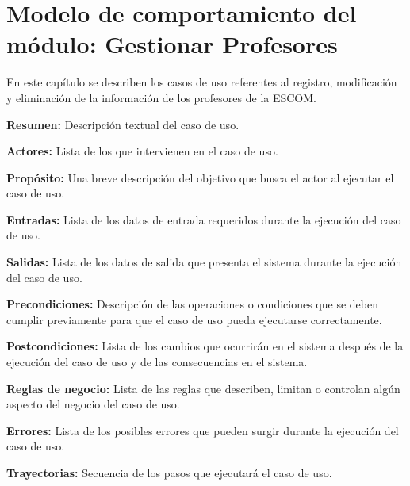 \newpage

\section{Modelo de comportamiento del módulo: Gestionar Profesores \label{chp:gestionarProfesores}}
En este capítulo se describen los casos de uso referentes al registro, modificación y eliminación de la información de los profesores de la ESCOM. \bigskip

     \begin{objetivos}
	\item {\bf Resumen:} Descripción textual del caso de uso.
	\item {\bf Actores:} Lista de los 
	 que intervienen en el caso de uso.
	\item {\bf Propósito:} Una breve descripción del objetivo que busca el actor al ejecutar el caso de uso.
	\item {\bf Entradas:} Lista de los datos de entrada requeridos durante la ejecución del caso de uso.
	\item {\bf Salidas:} Lista de los datos de salida que presenta el sistema durante la ejecución del caso de uso.
	\item {\bf Precondiciones:} Descripción de las operaciones o condiciones que se deben cumplir previamente para que el caso de uso pueda ejecutarse correctamente.
	\item {\bf Postcondiciones:} Lista de los cambios que ocurrirán en el sistema después de la ejecución del caso de uso y de las consecuencias en el sistema.
	\item {\bf Reglas de negocio:} Lista de las reglas que describen, limitan o controlan algún aspecto del negocio del caso de uso.
	\item {\bf Errores:} Lista de los posibles errores que pueden surgir durante la ejecución del caso de uso.
	\item {\bf Trayectorias:} Secuencia de los pasos que ejecutará el caso de uso.
    \end{objetivos}

	
